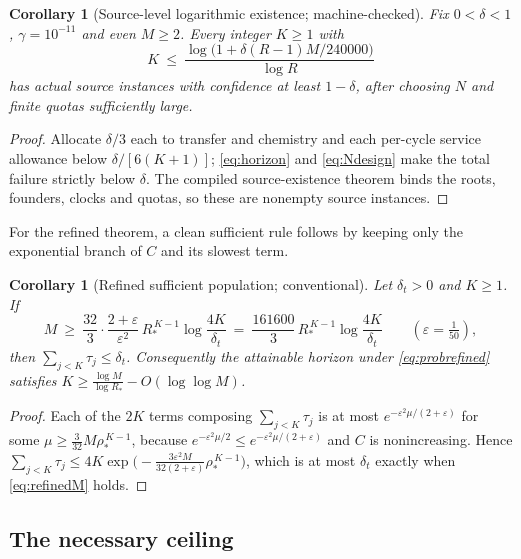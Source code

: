 \documentclass[11pt,a4paper]{article}
\theoremstyle{plain}
\newtheorem{corollary}[theorem]{Corollary}
\theoremstyle{definition}
\theoremstyle{remark}
\newcommand{\eps}{\varepsilon}
\begin{document}
\begin{corollary}[Source-level logarithmic existence; machine-checked]\label{cor:log}
Fix $0<\delta<1$, $\gamma=10^{-11}$ and even $M\ge2$. Every integer $K\ge1$
with
\begin{equation}\label{eq:sufficientK}
K\ \le\ \frac{\log\bigl(1+\delta(R-1)M/240000\bigr)}{\log R}
\end{equation}
has actual source instances with confidence at least $1-\delta$, after choosing
$N$ and finite quotas sufficiently large.
\end{corollary}

\begin{proof}
Allocate $\delta/3$ each to transfer and chemistry and each per-cycle service
allowance below $\delta/[6(K+1)]$; \eqref{eq:horizon} and \eqref{eq:Ndesign}
make the total failure strictly below $\delta$. The compiled source-existence
theorem binds the roots, founders, clocks and quotas, so these are nonempty
source instances.
\end{proof}

For the refined theorem, a clean sufficient rule follows by keeping only the
exponential branch of $C$ and its slowest term.

\begin{corollary}[Refined sufficient population; conventional]\label{cor:refinedM}
Let $\delta_t>0$ and $K\ge1$. If
\begin{equation}\label{eq:refinedM}
M\ \ge\ \frac{32}{3}\cdot\frac{2+\eps}{\eps^2}\,R_*^{\,K-1}\log\frac{4K}{\delta_t}
\ =\ \frac{161600}{3}\,R_*^{\,K-1}\log\frac{4K}{\delta_t}
\qquad(\eps=\tfrac1{50}),
\end{equation}
then $\sum_{j<K}\tau_j\le\delta_t$. Consequently the attainable horizon under
\eqref{eq:probrefined} satisfies
$K\ge\frac{\log M}{\log R_*}-O(\log\log M)$.
\end{corollary}

\begin{proof}
Each of the $2K$ terms composing $\sum_{j<K}\tau_j$ is at most
$e^{-\eps^2\mu/(2+\eps)}$ for some $\mu\ge\frac3{32}M\rho_*^{\,K-1}$, because
$e^{-\eps^2\mu/2}\le e^{-\eps^2\mu/(2+\eps)}$ and $C$ is nonincreasing. Hence
$\sum_{j<K}\tau_j\le4K\exp\bigl(-\frac{3\eps^2M}{32(2+\eps)}\rho_*^{\,K-1}\bigr)$,
which is at most $\delta_t$ exactly when \eqref{eq:refinedM} holds.
\end{proof}

\subsection{The necessary ceiling}
\end{document}
